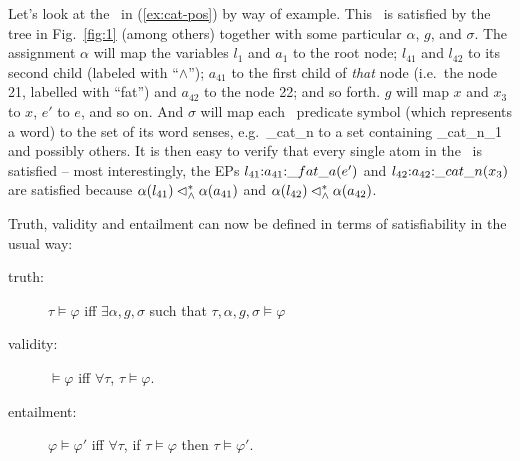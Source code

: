 Let's look at the \rmrs\ in (\ref{ex:cat-pos}) by way of example.
This \rmrs\ is satisfied by the tree in Fig.~\ref{fig:1} (among
others) together with some particular $\alpha$, $g$, and $\sigma$.
The assignment $\alpha$ will map the variables $l_1$ and $a_1$ to the
root node; $l_{41}$ and $l_{42}$ to its second child (labeled with
``$\wedge$''); $a_{41}$ to the first child of \emph{that} node (i.e.\
the node 21, labelled with ``fat'') and $a_{42}$ to the node 22; and
so forth.  $g$ will map $x$ and $x_3$ to $x$, $e'$ to $e$, and so on.
And $\sigma$ will map each \rmrs\ predicate symbol (which represents a
word) to the set of its word senses, e.g.\ \_cat\_n to a set
containing \_cat\_n\_1 and possibly others.  It is then easy to verify
that every single atom in the \rmrs\ is satisfied -- most
interestingly, the EPs $l_{41} {:} a_{41} {:} \_fat\_a(e')$ and
$l_{42} {:} a_{42} {:} \_cat\_n(x_3)$ are satisfied because
$\alpha(l_{41}) \lhd^*_\wedge \alpha(a_{41})$ and $\alpha(l_{42})
\lhd^*_\wedge \alpha(a_{42})$.

Truth, validity and entailment can now be defined in terms of
satisfiability in the usual way:
\begin{definition}\label{defn:entailment}
\begin{description}
\item   [truth:] $\tau\models \varphi$ iff $\exists \alpha,g,\sigma$  such
  that $\tau,\alpha,g,\sigma\models \varphi$
\item   [validity:] $\models \varphi$ iff $\forall \tau$, $\tau\models \varphi$.
\item   [entailment:] $\varphi\models \varphi'$ iff $\forall \tau$, if
  $\tau\models \varphi$ then $\tau\models \varphi'$.
\end{description}
\end{definition}



